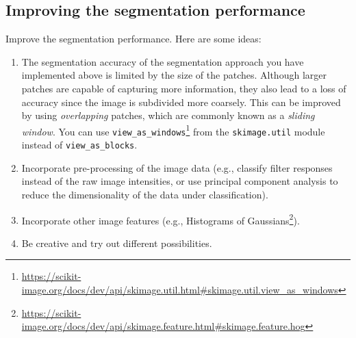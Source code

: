 \documentclass[12pt,a4paper]{article}
\begin{document}
\begin{samepage}
\section{Improving the segmentation performance}
\label{task:svm_segm_semantic}

Improve the segmentation performance. Here are some ideas:
\begin{enumerate}
    \item The segmentation accuracy of the segmentation approach you have implemented above is limited by the size of the patches. Although larger patches are capable of capturing more information, they also lead to a loss of accuracy since the image is subdivided more coarsely. This can be improved by using \emph{overlapping} patches, which are commonly known as a \emph{sliding window}. You can use \texttt{view\_as\_windows}\footnote{\mbox{\url{https://scikit-image.org/docs/dev/api/skimage.util.html\#skimage.util.view\_as\_windows}}} from the \texttt{skimage.util} module instead of \texttt{view\_as\_blocks}.
    \item Incorporate pre-processing of the image data (e.g., classify filter responses instead of the raw image intensities, or use principal component analysis to reduce the dimensionality of the data under classification).
    \item Incorporate other image features (e.g., Histograms of Gaussians\footnote{\mbox{\url{https://scikit-image.org/docs/dev/api/skimage.feature.html\#skimage.feature.hog}}}).
    \item Be creative and try out different possibilities.
\end{enumerate}
\end{samepage}
\end{document}
